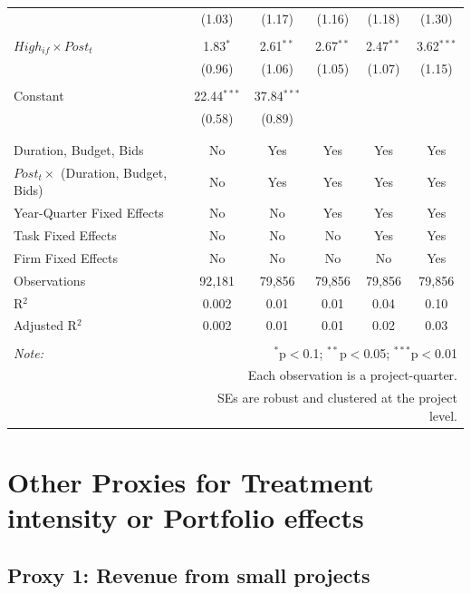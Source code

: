 \documentclass[]{article}
\begin{document}
\begin{table}[H]
\begin{tabular}{@{\extracolsep{-2pt}}lccccc}
  & (1.03) & (1.17) & (1.16) & (1.18) & (1.30) \\ 
  & & & & & \\ 
 $High_{if} \times Post_t$ & 1.83$^{*}$ & 2.61$^{**}$ & 2.67$^{**}$ & 2.47$^{**}$ & 3.62$^{***}$ \\ 
  & (0.96) & (1.06) & (1.05) & (1.07) & (1.15) \\ 
  & & & & & \\ 
 Constant & 22.44$^{***}$ & 37.84$^{***}$ &  &  &  \\ 
  & (0.58) & (0.89) &  &  &  \\ 
  & & & & & \\ 
\hline \\[-1.8ex] 
Duration, Budget, Bids & No & Yes & Yes & Yes & Yes \\ 
$Post_t \times$  (Duration, Budget, Bids) & No & Yes & Yes & Yes & Yes \\ 
Year-Quarter Fixed Effects & No & No & Yes & Yes & Yes \\ 
Task Fixed Effects & No & No & No & Yes & Yes \\ 
Firm Fixed Effects & No & No & No & No & Yes \\ 
Observations & 92,181 & 79,856 & 79,856 & 79,856 & 79,856 \\ 
R$^{2}$ & 0.002 & 0.01 & 0.01 & 0.04 & 0.10 \\ 
Adjusted R$^{2}$ & 0.002 & 0.01 & 0.01 & 0.02 & 0.03 \\ 
\hline 
\hline \\[-1.8ex] 
\textit{Note:}  & \multicolumn{5}{r}{$^{*}$p$<$0.1; $^{**}$p$<$0.05; $^{***}$p$<$0.01} \\ 
 & \multicolumn{5}{r}{Each observation is a project-quarter.} \\ 
 & \multicolumn{5}{r}{SEs are robust and clustered at the project level.} \\ 
\end{tabular} 
\end{table}

\hypertarget{other-proxies-for-treatment-intensity-or-portfolio-effects}{%
\section{Other Proxies for Treatment intensity or Portfolio
effects}\label{other-proxies-for-treatment-intensity-or-portfolio-effects}}

\hypertarget{proxy-1-revenue-from-small-projects}{%
\subsection{Proxy 1: Revenue from small
projects}\label{proxy-1-revenue-from-small-projects}}
\end{document}
